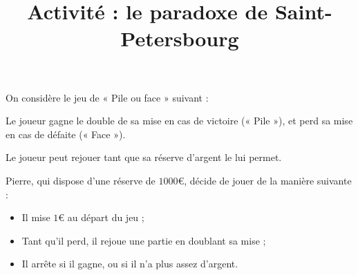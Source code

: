 \documentclass[
	classe=$2^{de}$
]{informatique}
\begin{document}
\title{Activité : le paradoxe de Saint-Petersbourg}
\maketitle

On considère le jeu de « Pile ou face » suivant :
\begin{tcolorbox}
	Le joueur gagne le double de sa mise en cas de victoire (« Pile »), et perd sa mise en cas de défaite (« Face »).

	Le joueur peut rejouer tant que sa réserve d'argent le lui permet.
\end{tcolorbox}

Pierre, qui dispose d'une réserve de $1000$€, décide de jouer de la manière suivante :
\begin{itemize}
	\item Il mise $1$€ au départ du jeu ;
	\item Tant qu'il perd, il rejoue une partie en doublant sa mise ;
	\item Il arrête si il gagne, ou si il n'a plus assez d'argent.
\end{itemize}
\end{document}
